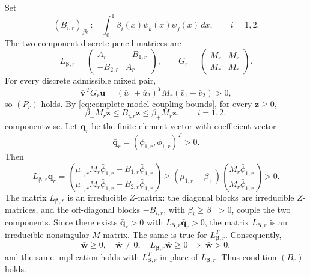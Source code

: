 \documentclass[preprint,10pt]{elsarticle}
\theoremstyle{plain}
\theoremstyle{definition}
\theoremstyle{remark}
\begin{document}
Set
\[
(B_{i,r})_{jk}:=\int_0^1\beta_i(x)\psi_k(x)\psi_j(x)\,dx,
\qquad i=1,2.
\]
The two-component discrete pencil matrices are
\begin{equation}\label{eq:complete-model-discrete-pencil}
	L_{\boldsymbol\beta,r}
	=\begin{pmatrix}A_r&-B_{1,r}\\-B_{2,r}&A_r\end{pmatrix},
	\qquad
	G_r=\begin{pmatrix}M_r&M_r\\M_r&M_r\end{pmatrix}.
\end{equation}
For every discrete admissible mixed pair,
\[
\bar{\mathbf v}^{\,T}G_r\bar{\mathbf u}
=(\bar u_1+\bar u_2)^TM_r(\bar v_1+\bar v_2)>0,
\]
so $(P_r)$ holds. By \eqref{eq:complete-model-coupling-bounds}, for every
$\bar{\mathbf z}\ge0$,
\begin{equation}\label{eq:complete-model-weighted-mass-bounds}
	\beta_-M_r\bar{\mathbf z}\le B_{i,r}\bar{\mathbf z}\le\beta_+M_r\bar{\mathbf z},
	\qquad i=1,2,
\end{equation}
componentwise. Let $\mathbf q_r$ be the finite element vector with coefficient
vector
\[
\bar{\mathbf q}_r=(\bar\phi_{1,r},\bar\phi_{1,r})^T>0.
\]
Then
\[
L_{\boldsymbol\beta,r}\bar{\mathbf q}_r
=
\binom{\mu_{1,r}M_r\bar\phi_{1,r}-B_{1,r}\bar\phi_{1,r}}
{\mu_{1,r}M_r\bar\phi_{1,r}-B_{2,r}\bar\phi_{1,r}}
\ge
(\mu_{1,r}-\beta_+)
\binom{M_r\bar\phi_{1,r}}{M_r\bar\phi_{1,r}}>0.
\]
The matrix $L_{\boldsymbol\beta,r}$ is an irreducible $Z$-matrix: the diagonal
blocks are irreducible $Z$-matrices, and the off-diagonal blocks
$-B_{i,r}$, with $\beta_i\ge\beta_->0$, couple the two components. Since
there exists $\bar{\mathbf q}_r>0$ with
$L_{\boldsymbol\beta,r}\bar{\mathbf q}_r>0$, the matrix
$L_{\boldsymbol\beta,r}$ is an irreducible nonsingular $M$-matrix. The same is
true for $L_{\boldsymbol\beta,r}^T$. Consequently,
\[
\bar{\mathbf w}\ge0,\quad\bar{\mathbf w}\ne0,\quad
L_{\boldsymbol\beta,r}\bar{\mathbf w}\ge0
\;\Longrightarrow\;\bar{\mathbf w}>0,
\]
and the same implication holds with $L_{\boldsymbol\beta,r}^T$ in place of
$L_{\boldsymbol\beta,r}$. Thus condition $(B_r)$ holds.
\end{document}
